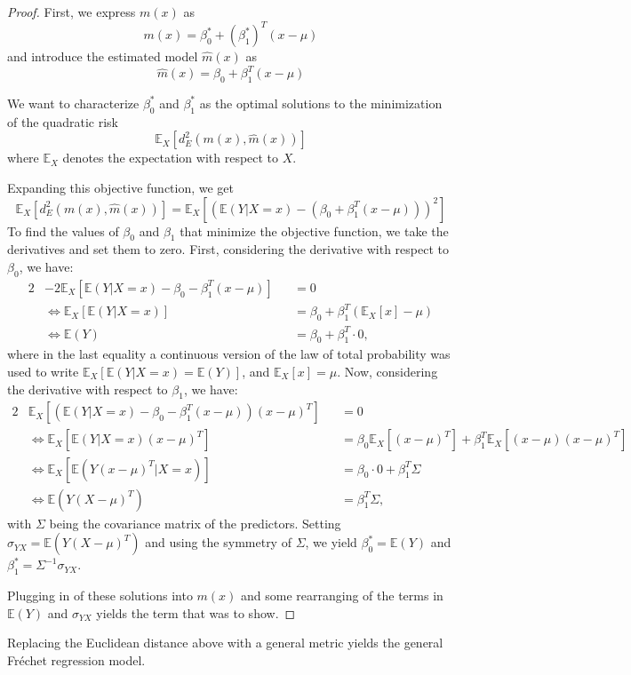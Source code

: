 \begin{proof}
    First, we express \( m(x) \) as
    \[
    m(x) = \beta_0^* + (\beta_1^*)^T (x - \mu)
    \]
    and introduce the estimated model \( \hat{m}(x) \) as
    \[
    \hat{m}(x) = \beta_0 + \beta_1^T (x - \mu)
    \]
    
    We want to characterize \( \beta_0^* \) and \( \beta_1^* \) as the optimal solutions
    to the minimization of the quadratic risk
    \[
    \mathbb{E}_X \left[ d_E^2(m(x), \hat{m}(x)) \right]
    \]
    where \( \mathbb{E}_X \) denotes the expectation with respect to \( X \).
    
    Expanding this objective function, we get
    \[
    \mathbb{E}_X \left[ d_E^2(m(x), \hat{m}(x)) \right] = \mathbb{E}_X \left[ \left( \mathbb{E}(Y|X=x) - \left( \beta_0 + \beta_1^T (x - \mu) \right) \right)^2 \right]
    \]
    To find the values of \( \beta_0 \) and \( \beta_1 \) that minimize the objective 
    function, we take the derivatives and set them to zero. First, considering the 
    derivative with respect to \( \beta_0 \), we have:
    \begin{alignat*}{2}
        & -2 \mathbb{E}_X \left[ \mathbb{E}(Y|X=x) - \beta_0 - \beta_1^T (x - \mu) \right] && = 0 \\
        & \iff \mathbb{E}_X \left[ \mathbb{E}(Y|X=x) \right] && = \beta_0 + \beta_1^T (\mathbb{E}_X \left[ x \right] - \mu)\\
        & \iff \mathbb{E}(Y) && = \beta_0 + \beta_1^T \cdot 0,
    \end{alignat*}
    where in the last equality a continuous version of the law of total probability was used to write
    $ \mathbb{E}_X \left[ \mathbb{E}(Y|X=x) = \mathbb{E}(Y)\right]$, and $\mathbb{E}_X \left[ x \right] = \mu$.
    Now, considering the derivative with respect to $\beta_1$, we have:
    \begin{alignat*}{2}
        & \mathbb{E}_X \left[ \left(\mathbb{E}(Y|X=x) - \beta_0 - \beta_1^T (x - \mu)\right) (x - \mu)^T \right] && = 0 \\
        & \iff \mathbb{E}_X \left[ \mathbb{E}(Y|X=x) (x-\mu)^T\right] && = \beta_0 \mathbb{E}_X \left[ (x- \mu)^T \right]+ \beta_1^T \mathbb{E}_X \left[ (x- \mu) (x - \mu)^T \right] \\
        & \iff \mathbb{E}_X \left[ \mathbb{E}(Y(x-\mu)^T|X=x) \right] && = \beta_0 \cdot 0 + \beta_1^T \Sigma \\
        & \iff \mathbb{E}(Y(X-\mu)^T) && = \beta_1^T \Sigma,
    \end{alignat*}
    with $\Sigma$ being the covariance matrix of the predictors. Setting $\sigma_{YX} = \mathbb{E}(Y(X-\mu)^T)$
    and using the symmetry of $\Sigma$,
    we yield $\beta_0^* = \mathbb{E}(Y)$ and $\beta_1^* = \Sigma^{-1} \sigma_{YX}$.

    Plugging in of these solutions into $m(x)$ and some rearranging of the terms in
    $\mathbb{E}(Y)$ and $\sigma_{YX}$ yields the term that was to show.
\end{proof}
Replacing the Euclidean distance above with a general metric yields the general Fréchet
regression model.

